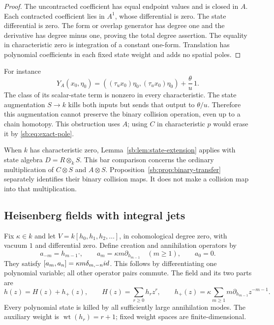 \begin{proof}
The uncontracted coefficient has equal endpoint values and is closed
in \(A\).  Each contracted coefficient lies in \(A^1\), whose
differential is zero.  The state differential is zero.  The form or
overlap generator has degree one and the derivative has degree minus
one, proving the total degree assertion.  The equality in characteristic
zero is integration of a constant one-form.  Translation has polynomial
coefficients in each fixed state weight and adds no spatial poles.
\end{proof}

For instance
\[
 Y_A(x_0,\eta_0)=((\tau_u x_0)\eta_0,(\tau_u x_0)\eta_0)
                         +\frac{\theta}{u}\,1.
\]
The class of its scalar-state term is nonzero in every characteristic.
The state augmentation \(S\to k\) kills both inputs but sends
that output to \(\theta/u\).  Therefore this augmentation cannot
preserve the binary collision operation, even up to a chain homotopy.
This obstruction uses \(A\); using \(C\) in characteristic
\(p\) would erase it by \eqref{sb:eq:exact-pole}.

When \(k\) has characteristic zero,
Lemma~\ref{sb:lem:state-extension} applies with state algebra
\(D=R\otimes_k S\).  This bar comparison concerns the
ordinary multiplication of \(C\otimes S\) and \(A\otimes S\).
Proposition~\ref{sb:prop:binary-transfer} separately identifies their binary
collision maps.  It does not make a collision map into that multiplication.

\subsection{Heisenberg fields with integral jets}

Fix \(\kappa\in k\) and let
\(V=k[h_0,h_1,h_2,\ldots]\), in cohomological degree zero,
with vacuum \(1\) and differential zero.  Define creation and
annihilation operators by
\[
 a_{-m}=h_{m-1}\cdot,\qquad
 a_m=\kappa m\partial_{h_{m-1}}\quad(m\ge1),\qquad a_0=0.
\]
They satisfy
\([a_m,a_n]=\kappa m\delta_{m,-n}id\).
This follows by differentiating one polynomial variable; all other
operator pairs commute.  The field and its two parts are
\[
 h(z)=H(z)+h_+(z),\qquad
 H(z)=\sum_{r\ge0}h_rz^r,\qquad
 h_+(z)=\kappa\sum_{m\ge1}m\partial_{h_{m-1}}z^{-m-1}.
\]
Every polynomial state is killed by all sufficiently large annihilation
modes.  The auxiliary weight is \(\operatorname{wt}(h_r)=r+1\); fixed
weight spaces are finite-dimensional.

